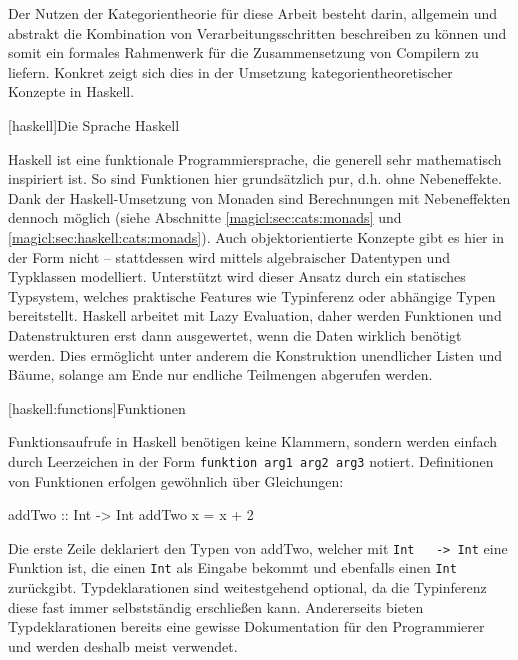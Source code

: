 \documentclass[12pt, a4paper, bibgerm]{scrbook}
\newenvironment{DIFnomarkup}{}{}
\newcommand\icode[1]{\lstinline?#1?}
\newcommand\lchapter{}
\newcommand\lsection{}
\begin{document}
Der Nutzen der Kategorientheorie für diese Arbeit besteht darin,
allgemein und abstrakt die Kombination von Verarbeitungsschritten
beschreiben zu können und somit ein formales Rahmenwerk für die
Zusammensetzung von Compilern zu liefern. Konkret zeigt sich dies in der
Umsetzung kategorientheoretischer Konzepte in Haskell.

\lchapter[haskell]{Die Sprache Haskell}

Haskell ist eine funktionale Programmiersprache, die generell sehr
mathematisch inspiriert ist. So sind Funktionen hier grundsätzlich pur,
d.h. ohne Nebeneffekte. Dank der Haskell-Umsetzung von Monaden sind
Berechnungen mit Nebeneffekten dennoch möglich (siehe Abschnitte
\ref{magicl:sec:cats:monads} und
\ref{magicl:sec:haskell:cats:monads}). Auch objektorientierte Konzepte
gibt es hier in der Form nicht -- stattdessen wird mittels algebraischer
Datentypen und Typklassen modelliert. Unterstützt wird dieser Ansatz
durch ein statisches Typsystem, welches praktische Features wie
Typinferenz oder abhängige Typen bereitstellt. Haskell arbeitet mit Lazy
Evaluation, daher werden Funktionen und Datenstrukturen erst dann
ausgewertet, wenn die Daten wirklich benötigt werden. Dies ermöglicht
unter anderem die Konstruktion unendlicher Listen und Bäume, solange am
Ende nur endliche Teilmengen abgerufen werden.

\lsection[haskell:functions]{Funktionen}

Funktionsaufrufe in Haskell benötigen keine Klammern, sondern werden
einfach durch Leerzeichen in der Form \icode{funktion arg1 arg2 arg3}
notiert. Definitionen von Funktionen erfolgen gewöhnlich über
Gleichungen:
\begin{DIFnomarkup}\begin{code}
addTwo :: Int -> Int
addTwo x = x + 2  
\end{code}\end{DIFnomarkup}
Die erste Zeile deklariert den Typen von addTwo, welcher mit \icode{Int
  -> Int} eine Funktion ist, die einen \icode{Int} als Eingabe bekommt
und ebenfalls einen \icode{Int} zurückgibt. Typdeklarationen sind
weitestgehend optional, da die Typinferenz diese fast immer
selbstständig erschließen kann. Andererseits bieten Typdeklarationen
bereits eine gewisse Dokumentation für den Programmierer und werden
deshalb meist verwendet.
\end{document}
